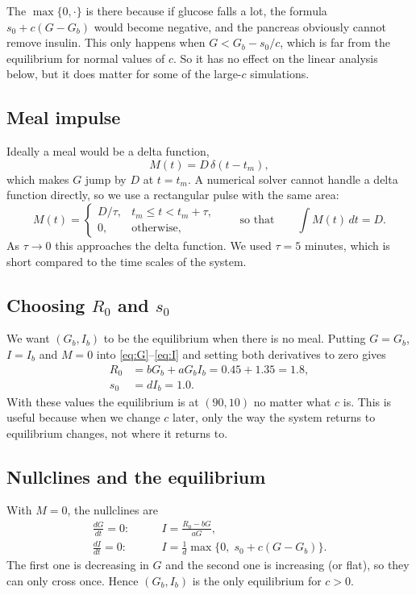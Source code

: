 \documentclass[11pt,a4paper]{article}
\newcommand{\Gb}{G_b}
\newcommand{\Ib}{I_b}
\begin{document}
The $\max\{0,\cdot\}$ is there because if glucose falls a lot, the formula $s_0+c(G-\Gb)$ would become negative, and the pancreas obviously cannot remove insulin. This only happens when $G<\Gb-s_0/c$, which is far from the equilibrium for normal values of $c$. So it has no effect on the linear analysis below, but it does matter for some of the large-$c$ simulations.

\subsection{Meal impulse}
Ideally a meal would be a delta function,
\begin{equation}
M(t) = D\,\delta(t-t_m),
\end{equation}
which makes $G$ jump by $D$ at $t=t_m$. A numerical solver cannot handle a delta function directly, so we use a rectangular pulse with the same area:
\begin{equation}\label{eq:pulse}
M(t) = \begin{cases} D/\tau, & t_m \le t < t_m+\tau,\\ 0, & \text{otherwise,} \end{cases}
\qquad\text{so that}\qquad \int M(t)\,dt = D .
\end{equation}
As $\tau\to0$ this approaches the delta function. We used $\tau=5$ minutes, which is short compared to the time scales of the system.

\subsection{Choosing $R_0$ and $s_0$}
We want $(\Gb,\Ib)$ to be the equilibrium when there is no meal. Putting $G=\Gb$, $I=\Ib$ and $M=0$ into \eqref{eq:G}--\eqref{eq:I} and setting both derivatives to zero gives
\begin{align}
R_0 &= b\Gb + a\Gb\Ib = 0.45 + 1.35 = 1.8, \\
s_0 &= d\Ib = 1.0 .
\end{align}
With these values the equilibrium is at $(90,10)$ no matter what $c$ is. This is useful because when we change $c$ later, only the way the system returns to equilibrium changes, not where it returns to.

\subsection{Nullclines and the equilibrium}
With $M=0$, the nullclines are
\begin{align}
\frac{dG}{dt}=0:&\qquad I = \frac{R_0 - bG}{aG}, \label{eq:Gnull}\\
\frac{dI}{dt}=0:&\qquad I = \frac{1}{d}\max\{0,\; s_0 + c(G-\Gb)\}. \label{eq:Inull}
\end{align}
The first one is decreasing in $G$ and the second one is increasing (or flat), so they can only cross once. Hence $(\Gb,\Ib)$ is the only equilibrium for $c>0$.
\end{document}
